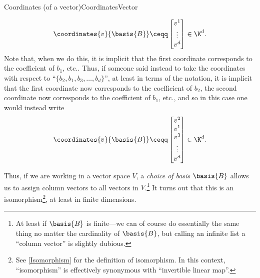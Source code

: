 \begin{dfn}{Coordinates (of a vector)}{CoordinatesVector}
\begin{rmk}
\begin{equation}
			\coordinates{v}{\basis{B}}\ceqq \begin{bmatrix}v^1 \\ \vdots \\ v^d\end{bmatrix}\in \K ^d.
		\end{equation}
		Note that, when we do this, it is implicit that the first coordinate corresponds to the coefficient of $b_1$, etc..  Thus, if someone said instead to take the coordinates with respect to ``$\{ b_2,b_1,b_3,\ldots ,b_d\}$'', at least in terms of the notation, it is implicit that the first coordinate now corresponds to the coefficient of $b_2$, the second coordinate now corresponds to the coefficient of $b_1$, etc., and so in this case one would instead write
		\begin{equation}
			\coordinates{v}{\basis{B}}\ceqq \begin{bmatrix}v^2 \\ v^1 \\ v^3 \\ \vdots \\ v^d\end{bmatrix}\in \K ^d.
		\end{equation}
	\end{rmk}
\end{dfn}
Thus, if we are working in a vector space $V$, a \emph{choice of basis $\basis{B}$} allows us to assign column vectors to all vectors in $V$.\footnote{At least if $\basis{B}$ is finite---we can of course do essentially the same thing no matter the cardinality of $\basis{B}$, but calling an infinite list a ``column vector'' is slightly dubious.}  It turns out that this is an isomorphism\footnote{See \cref{Isomorphism} for the definition of isomorphism.  In this context, ``isomorphism'' is effectively synonymous with ``invertible linear map''.}, at least in finite dimensions.
